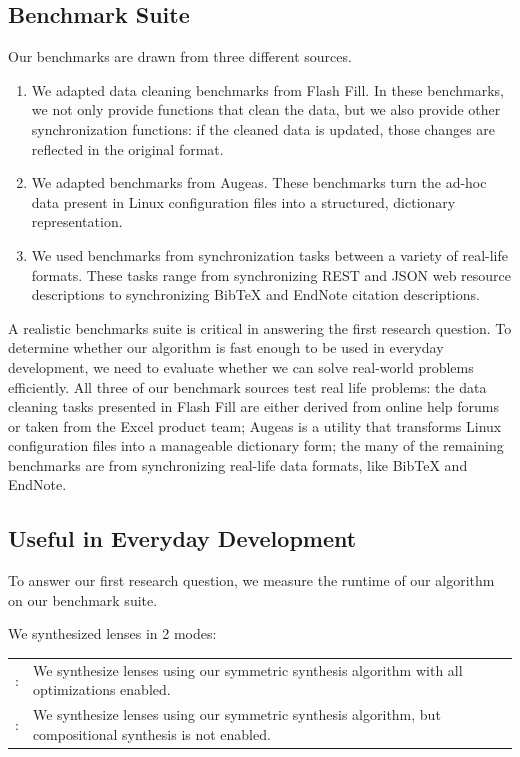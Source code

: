 \documentclass[acmsmall,screen,anonymous]{acmart}
\begin{document}
\subsection{Benchmark Suite}
Our benchmarks are drawn from three different sources.
\begin{enumerate}
\item We adapted  data cleaning benchmarks from Flash Fill. In these
  benchmarks, we not only provide functions that clean the data, but we also
  provide other synchronization functions: if the cleaned data is updated, those
  changes are reflected in the original format.
\item We adapted  benchmarks from Augeas. These benchmarks turn the
  ad-hoc data present in Linux configuration files into a structured, dictionary
  representation.
\item We used  benchmarks from synchronization tasks between a
  variety of real-life formats. These tasks range from synchronizing REST
  and JSON web resource descriptions to synchronizing BibTeX and EndNote
  citation descriptions.
\end{enumerate}

A realistic benchmarks suite is critical in answering the first research
question. To determine whether our algorithm is fast enough to be used in
everyday development, we need to evaluate whether we can solve real-world
problems efficiently. All three of our benchmark sources test real life
problems: the data cleaning tasks presented in Flash Fill are either derived
from online help forums or taken from the Excel product team; Augeas is a
utility that transforms Linux configuration files into a manageable dictionary
form; the many of the remaining benchmarks are from synchronizing real-life data
formats, like BibTeX and EndNote.

\subsection{Useful in Everyday Development}

To answer our first research question, we measure the runtime of our algorithm
on our benchmark suite.

We synthesized lenses in 2 modes:

\begin{tabulary}{\linewidth}{rL}
  \SSOpt{}: & We synthesize lenses using our symmetric synthesis algorithm with all optimizations enabled.\\
  \SSNCOpt{}: & We synthesize lenses using our symmetric synthesis algorithm,
                but compositional synthesis is not enabled.\\
\end{tabulary}\\
\end{document}
